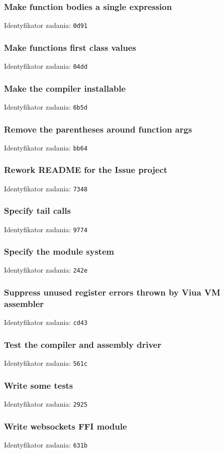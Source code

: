 \subsubsection{Make function bodies a single expression}

Identyfikator zadania: \texttt{0d91}

\subsubsection{Make functions first class values}

Identyfikator zadania: \texttt{04dd}

\subsubsection{Make the compiler installable}

Identyfikator zadania: \texttt{6b5d}

\subsubsection{Remove the parentheses around function args}

Identyfikator zadania: \texttt{bb64}

\subsubsection{Rework README for the Issue project}

Identyfikator zadania: \texttt{7348}

\subsubsection{Specify tail calls}

Identyfikator zadania: \texttt{9774}

\subsubsection{Specify the module system}

Identyfikator zadania: \texttt{242e}

\subsubsection{Suppress unused register errors thrown by Viua VM assembler}

Identyfikator zadania: \texttt{cd43}

\subsubsection{Test the compiler and assembly driver}

Identyfikator zadania: \texttt{561c}

\subsubsection{Write some tests}

Identyfikator zadania: \texttt{2925}

\subsubsection{Write websockets FFI module}

Identyfikator zadania: \texttt{631b}
